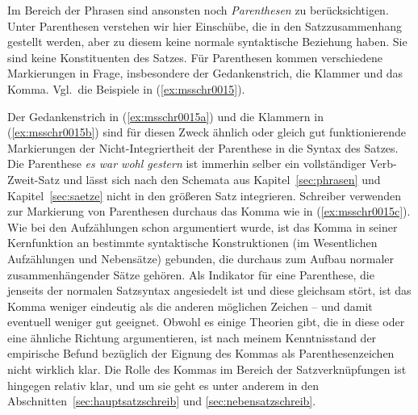 
Im Bereich der Phrasen sind ansonsten noch \textit{Parenthesen} zu berücksichtigen.
Unter Parenthesen verstehen wir hier Einschübe, die in den Satzzusammenhang gestellt werden, aber zu diesem keine normale syntaktische Beziehung haben.
Sie sind keine Konstituenten des Satzes.
Für Parenthesen kommen verschiedene Markierungen in Frage, insbesondere der Gedankenstrich, die Klammer und das Komma.
Vgl.\ die Beispiele in (\ref{ex:msschr0015}).

\begin{exe}
  \ex\label{ex:msschr0015} 
  \begin{xlist}
  \end{xlist}
\end{exe}

Der Gedankenstrich in (\ref{ex:msschr0015a}) und die Klammern in (\ref{ex:msschr0015b}) sind für diesen Zweck ähnlich oder gleich gut funktionierende Markierungen der Nicht-Integriertheit der Parenthese in die Syntax des Satzes.
Die Parenthese \textit{es war wohl gestern} ist immerhin selber ein vollständiger Verb-Zweit-Satz und lässt sich nach den Schemata aus Kapitel~\ref{sec:phrasen} und Kapitel~\ref{sec:saetze} nicht in den größeren Satz integrieren.
Schreiber verwenden zur Markierung von Parenthesen durchaus das Komma wie in (\ref{ex:msschr0015c}).
Wie bei den Aufzählungen schon argumentiert wurde, ist das Komma in seiner Kernfunktion an bestimmte syntaktische Konstruktionen (im Wesentlichen Aufzählungen und Nebensätze) gebunden, die durchaus zum Aufbau normaler zusammenhängender Sätze gehören.
Als Indikator für eine Parenthese, die jenseits der normalen Satzsyntax angesiedelt ist und diese gleichsam stört, ist das Komma weniger eindeutig als die anderen möglichen Zeichen -- und damit eventuell weniger gut geeignet.
Obwohl es einige Theorien gibt, die in diese oder eine ähnliche Richtung argumentieren, ist nach meinem Kenntnisstand der empirische Befund bezüglich der Eignung des Kommas als Parenthesenzeichen nicht wirklich klar.
Die Rolle des Kommas im Bereich der Satzverknüpfungen ist hingegen relativ klar, und um sie geht es unter anderem in den Abschnitten~\ref{sec:hauptsatzschreib} und \ref{sec:nebensatzschreib}.

